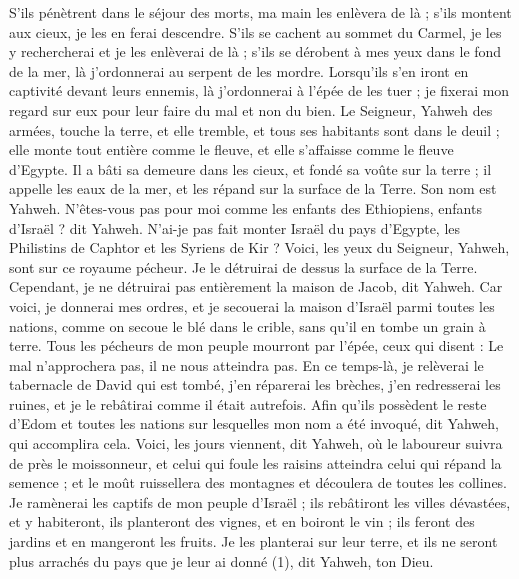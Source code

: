 \begin{multicols}{2}
S’ils pénètrent dans le séjour des morts, ma main les enlèvera de là ; s’ils montent aux cieux, je les en ferai descendre.
S’ils se cachent au sommet du Carmel, je les y rechercherai et je les enlèverai de là ; s’ils se dérobent à mes yeux dans le fond de la mer, là j’ordonnerai au serpent de les mordre.
Lorsqu'ils s'en iront en captivité devant leurs ennemis, là j’ordonnerai à l’épée de les tuer ; je fixerai mon regard sur eux pour leur faire du mal et non du bien.
Le Seigneur, Yahweh des armées, touche la terre, et elle tremble, et tous ses habitants sont dans le deuil ; elle monte tout entière comme le fleuve, et elle s’affaisse comme le fleuve d'Egypte.
Il a bâti sa demeure dans les cieux, et fondé sa voûte sur la terre ; il appelle les eaux de la mer, et les répand sur la surface de la Terre. Son nom est Yahweh.
N'êtes-vous pas pour moi comme les enfants des Ethiopiens, enfants d'Israël ? dit Yahweh. N'ai-je pas fait monter Israël du pays d'Egypte, les Philistins de Caphtor et les Syriens de Kir ?
Voici, les yeux du Seigneur, Yahweh, sont sur ce royaume pécheur. Je le détruirai de dessus la surface de la Terre. Cependant, je ne détruirai pas entièrement la maison de Jacob, dit Yahweh.
Car voici, je donnerai mes ordres, et je secouerai la maison d'Israël parmi toutes les nations, comme on secoue le blé dans le crible, sans qu'il en tombe un grain à terre.
Tous les pécheurs de mon peuple mourront par l'épée, ceux qui disent : Le mal n'approchera pas, il ne nous atteindra pas.
En ce temps-là, je relèverai le tabernacle de David qui est tombé, j’en réparerai les brèches, j’en redresserai les ruines, et je le rebâtirai comme il était autrefois.
Afin qu'ils possèdent le reste d’Edom et toutes les nations sur lesquelles mon nom a été invoqué, dit Yahweh, qui accomplira cela.
Voici, les jours viennent, dit Yahweh, où le laboureur suivra de près le moissonneur, et celui qui foule les raisins atteindra celui qui répand la semence ; et le moût ruissellera des montagnes et découlera de toutes les collines.
Je ramènerai les captifs de mon peuple d'Israël ; ils rebâtiront les villes dévastées, et y habiteront, ils planteront des vignes, et en boiront le vin ; ils feront des jardins et en mangeront les fruits.
Je les planterai sur leur terre, et ils ne seront plus arrachés du pays que je leur ai donné (1), dit Yahweh, ton Dieu.
\PPE{}
\end{multicols}
